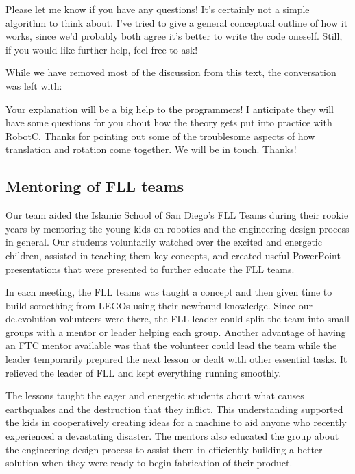 \begin{fancyquotes}
Please let me know if you have any questions! It's certainly not a simple algorithm to think about. I've tried to give a general conceptual outline of how it works, since we'd probably both agree it's better to write the code oneself. Still, if you would like further help, feel free to ask!
\end{fancyquotes}

While we have removed most of the discussion from this text, the conversation was left with:

\begin{fancyquotes}
Your explanation will be a big help to the programmers! I anticipate they will have some questions for you about how the theory gets put into practice with RobotC. Thanks for pointing out some of the troublesome aspects of how translation and rotation come together. We will be in touch. Thanks! 
\end{fancyquotes}

\subsection{Mentoring of FLL teams}
Our team aided the Islamic School of San Diego's FLL Teams during their rookie years by mentoring the young kids on robotics and the engineering design process in general. Our students voluntarily watched over the excited and energetic children, assisted in teaching them key concepts, and created useful PowerPoint presentations that were presented to further educate the FLL teams.

In each meeting, the FLL teams was taught a concept and then given time to build something from LEGOs using their newfound knowledge. Since our de.evolution volunteers were there, the FLL leader could split the team into small groups with a mentor or leader helping each group. Another advantage of having an FTC mentor available was that the volunteer could lead the team while the leader temporarily prepared the next lesson or dealt with other essential tasks. It relieved the leader of FLL and kept everything running smoothly.

The lessons taught the eager and energetic students about what causes earthquakes and the destruction that they inflict. This understanding supported the kids in cooperatively creating ideas for a machine to aid anyone who recently experienced a devastating disaster. The mentors also educated the group about the engineering design process to assist them in efficiently building a better solution when they were ready to begin fabrication of their product.

